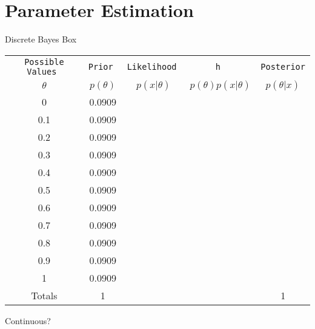 \chapter{Parameter Estimation}

Discrete
Bayes Box

\begin{table}
\begin{center}
\begin{tabular}{|c|c|c|c|c|}
\hline
\tt{Possible Values} & \tt{Prior} & \tt{Likelihood} & \tt{h} & \tt{Posterior}\\
$\theta$ & $p(\theta)$ & $p(x|\theta)$ & $p(\theta)p(x|\theta)$ & $p(\theta|x)$\\
\hline
0 & 0.0909 & & &\\
\hline
0.1 & 0.0909 & & &\\
\hline
0.2 & 0.0909 & & &\\
\hline
0.3 & 0.0909 & & &\\
\hline
0.4 & 0.0909 & & &\\
\hline
0.5 & 0.0909 & & &\\
\hline
0.6 & 0.0909 & & &\\
\hline
0.7 & 0.0909 & & &\\
\hline
0.8 & 0.0909 & & &\\
\hline
0.9 & 0.0909 & & &\\
\hline
1 & 0.0909 & & &\\
\hline
Totals & 1 & & & 1\\
\hline
\end{tabular}
\end{center}
\end{table}

Continuous?


